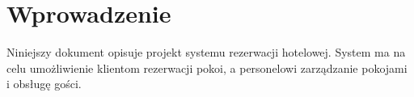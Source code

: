 \section{Wprowadzenie}

Niniejszy dokument opisuje projekt systemu rezerwacji hotelowej. System ma na celu umożliwienie klientom rezerwacji pokoi, a personelowi zarządzanie pokojami i obsługę gości.

